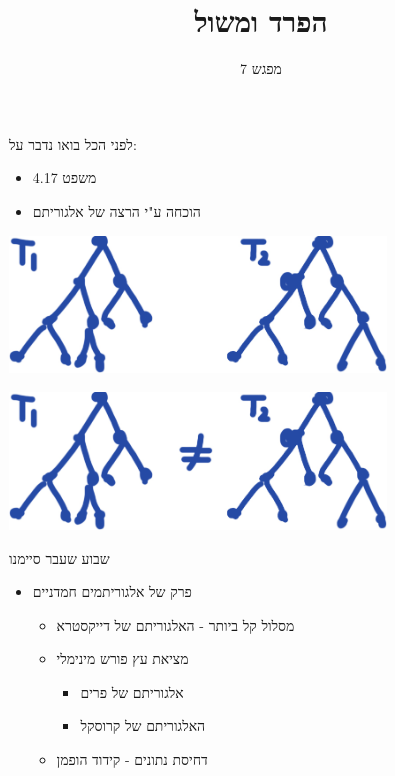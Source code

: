 \documentclass[handout]{beamer}
\begin{document}
	\title{הפרד ומשול}
	\subtitle{מפגש 7}
	\date{}
	\begin{frame}{לפני הכל בואו נדבר על:}
	\pause
	\begin{itemize}[<+->]
		\item משפט 4.17
		\item הוכחה ע"י הרצה של אלגוריתם
	\end{itemize}
\end{frame}
	\begin{frame}{}
\begin{center}
	\includegraphics[width=10cm]{imgs/trees}
	\end{center}
\end{frame}

\begin{frame}{}
\begin{center}
	\includegraphics[width=10cm]{imgs/trees2}
\end{center}
\end{frame}
	
	\frame{\titlepage}
	\begin{frame}{שבוע שעבר סיימנו}
	\pause
	
	\begin{itemize}[<+->]
		\item פרק של אלגוריתמים חמדניים
		\begin{itemize}[<+->]
\item מסלול קל ביותר - האלגוריתם של דייקסטרא
\item מציאת עץ פורש מינימלי 
\begin{itemize}[<+->]
			\item אלגוריתם של פרים
	\item האלגוריתם של קרוסקל
\end{itemize}
			\item  דחיסת נתונים - קידוד הופמן
		\end{itemize}
	\end{itemize}
\end{frame}
\end{document}
